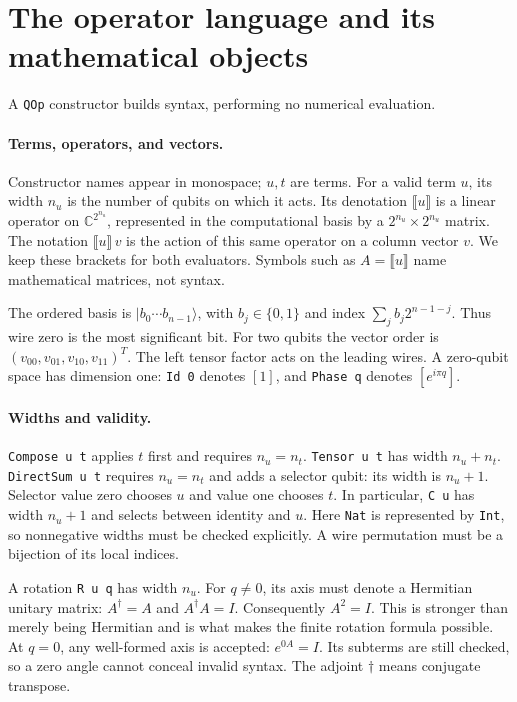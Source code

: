 \documentclass[11pt,a4paper]{article}
\newcommand{\C}{\mathbb{C}}
\newcommand{\sem}[1]{\llbracket #1\rrbracket}
\newcommand{\code}[1]{\texttt{#1}}
\newcommand{\ket}[1]{|#1\rangle}
\begin{document}
\section{The operator language and its mathematical objects}
\label{sec:language}
A \code{QOp} constructor builds syntax, performing no numerical evaluation.

\paragraph{Terms, operators, and vectors.}
Constructor names appear in monospace; $u,t$ are terms. For a valid term
$u$, its width $n_u$ is the number of qubits on which it acts. Its
denotation $\sem u$ is a linear operator on $\C^{2^{n_u}}$, represented
in the computational basis by a $2^{n_u}\times2^{n_u}$ matrix.
The notation $\sem u\,v$ is the action of this same operator on a column
vector $v$. We keep these brackets for both evaluators.
Symbols such as $A=\sem u$ name mathematical matrices, not syntax.

The ordered basis is $\ket{b_0\cdots b_{n-1}}$, with
$b_j\in\{0,1\}$ and index $\sum_j b_j2^{n-1-j}$. Thus wire zero is
the most significant bit. For two qubits the vector order is
$(v_{00},v_{01},v_{10},v_{11})^T$. The left tensor factor acts on the
leading wires. A zero-qubit space has dimension one: \code{Id 0} denotes
$[1]$, and \code{Phase q} denotes $[e^{i\pi q}]$.

\paragraph{Widths and validity.}
\code{Compose u t} applies $t$ first and requires $n_u=n_t$.
\code{Tensor u t} has width $n_u+n_t$.
\code{DirectSum u t} requires $n_u=n_t$ and adds a selector qubit:
its width is $n_u+1$. Selector value zero chooses $u$ and value one
chooses $t$. In particular, \code{C u} has width $n_u+1$ and selects
between identity and $u$. Here \code{Nat} is represented by \code{Int},
so nonnegative widths must be checked explicitly.
A wire permutation must be a bijection of its local indices.

A rotation \code{R u q} has width $n_u$. For $q\ne0$, its axis must denote a
Hermitian unitary matrix: $A^\dagger=A$ and $A^\dagger A=I$.
Consequently $A^2=I$. This is stronger than merely being Hermitian
and is what makes the finite rotation formula possible.
At $q=0$, any well-formed axis is accepted: $e^{0A}=I$.
Its subterms are still checked, so a zero angle cannot conceal invalid syntax.
The adjoint $\dagger$ means conjugate transpose.
\end{document}

